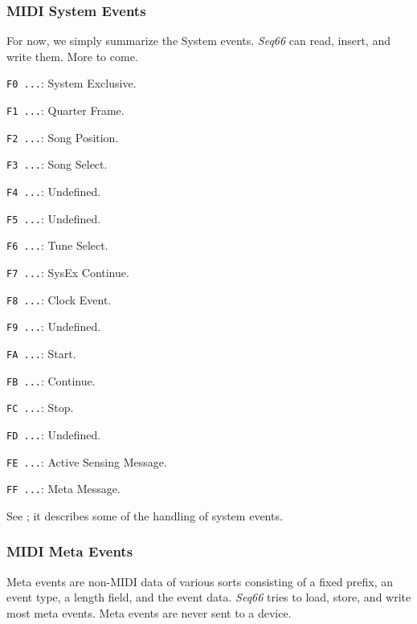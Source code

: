 \subsubsection{MIDI System Events}
\label{subsubsec:midi_system_events}

   For now, we simply summarize the System events. \textsl{Seq66}
   can read, insert, and write them.  More to come.

   \begin{enumber}
      \item \texttt{F0 ...}: System Exclusive.
      \item \texttt{F1 ...}: Quarter Frame.
      \item \texttt{F2 ...}: Song Position.
      \item \texttt{F3 ...}: Song Select.
      \item \texttt{F4 ...}: Undefined.
      \item \texttt{F5 ...}: Undefined.
      \item \texttt{F6 ...}: Tune Select.
      \item \texttt{F7 ...}: SysEx Continue.
      \item \texttt{F8 ...}: Clock Event.
      \item \texttt{F9 ...}: Undefined.
      \item \texttt{FA ...}: Start.
      \item \texttt{FB ...}: Continue.
      \item \texttt{FC ...}: Stop.
      \item \texttt{FD ...}: Undefined.
      \item \texttt{FE ...}: Active Sensing Message.
      \item \texttt{FF ...}: Meta Message.
   \end{enumber}

   See ; it describes some of the
   handling of system events.

\subsubsection{MIDI Meta Events}
\label{subsubsec:midi_meta_events}

   Meta events are non-MIDI data of various sorts consisting of a fixed prefix,
   an event type, a length field, and the event data.
   \textsl{Seq66} tries to load, store, and write most meta events.
   Meta events are never sent to a device.
 
